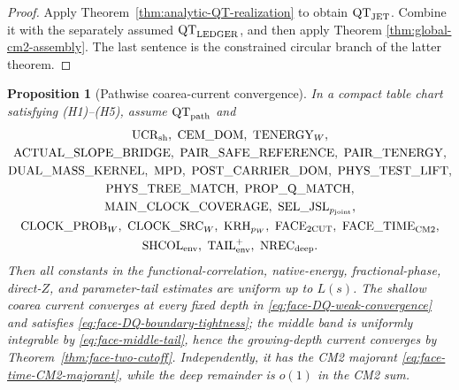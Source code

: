 \documentclass[11pt]{article}
\newtheorem{proposition}[theorem]{Proposition}
\begin{document}
\begin{proof}
Apply Theorem~\ref{thm:analytic-QT-realization} to obtain
$\mathrm{QT}_{\rm JET}$.  Combine it with the separately assumed
$\mathrm{QT}_{\rm LEDGER}$, and then apply Theorem
\ref{thm:global-cm2-assembly}.  The last sentence is the constrained
circular branch of the latter theorem.
\end{proof}

\begin{proposition}[Pathwise coarea-current convergence]
\label{prop:common-refinement-majorant}
In a compact table chart satisfying \textup{(H1)--(H5)}, assume
$\mathrm{QT}_{\rm path}$ and
\[
\begin{gathered}
 \mathrm{UCR}_{\rm sh},\ \mathrm{CEM\_DOM},\ \mathrm{TENERGY}_{W},\\
 \mathrm{ACTUAL\_SLOPE\_BRIDGE},\ \mathrm{PAIR\_SAFE\_REFERENCE},\
 \mathrm{PAIR\_TENERGY},\\
 \mathrm{DUAL\_MASS\_KERNEL},\ \mathrm{MPD},\
 \mathrm{POST\_CARRIER\_DOM},\ \mathrm{PHYS\_TEST\_LIFT},\\
 \mathrm{PHYS\_TREE\_MATCH},\ \mathrm{PROP\_Q\_MATCH},\\
 \mathrm{MAIN\_CLOCK\_COVERAGE},\
 \mathrm{SEL\_JSL}_{p_{\rm joint}},\\
 \mathrm{CLOCK\_PROB}_{W},\ \mathrm{CLOCK\_SRC}_{W},\
 \mathrm{KRH}_{p_W},\ \mathrm{FACE}_{\rm 2CUT},\
 \mathrm{FACE\_TIME}_{\rm CM2},\\
 \mathrm{SHCOL}_{\rm env},\ \mathrm{TAIL}_{\rm env}^{+},\
 \mathrm{NREC}_{\rm deep}.
\end{gathered}
\]
Then all constants in the
functional-correlation, native-energy, fractional-phase, direct-$Z$, and
parameter-tail estimates are uniform up to $L(s)$.  The shallow coarea current
converges at every fixed depth in
\eqref{eq:face-DQ-weak-convergence} and satisfies
\eqref{eq:face-DQ-boundary-tightness}; the middle band is uniformly
integrable by \eqref{eq:face-middle-tail}, hence the growing-depth current
converges by Theorem~\ref{thm:face-two-cutoff}.  Independently, it has the
CM2 majorant \eqref{eq:face-time-CM2-majorant}, while the deep
remainder is $o(1)$ in the CM2 sum.
\end{proposition}
\end{document}
